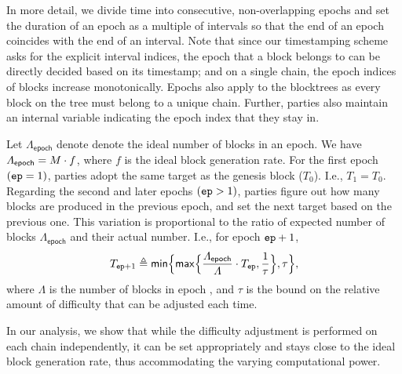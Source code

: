In more detail, we divide time into consecutive, non-overlapping epochs and set the duration \epochLen of an epoch as a multiple of intervals so that the end of an epoch coincides with the end of an interval.
%
Note that since our timestamping scheme asks for the explicit interval indices, the epoch that a block belongs to can be directly decided based on its timestamp; and on a single chain, the epoch indices of blocks increase monotonically.
%
Epochs also apply to the blocktrees as every block on the tree must belong to a unique chain.
%
Further, parties also maintain an internal variable \epoch indicating the epoch index that they stay in.

Let $\varLambda_{\mathsf{epoch}}$ denote denote the ideal number of blocks in an epoch.
%
We have $\varLambda_{\mathsf{epoch}} = M \cdot f$, where $f$ is the ideal block generation rate.
%
For the first epoch $(\mathtt{ep} = 1)$, parties adopt the same target as
the genesis block ($T_0$).
%
I.e., $T_1 = T_0$.
%
Regarding the second and later epochs $(\mathtt{ep} > 1)$, parties figure out how many blocks are produced in the previous epoch, and set the next target based on the previous one.
%
This variation is proportional to the ratio of expected number of blocks $\varLambda_{\mathsf{epoch}}$ and their actual number.
%
I.e., for epoch $\mathtt{ep} + 1$,
%
\begin{equation} \label{eq:target-recalc}
      T_{\mathtt{ep} + 1} \triangleq \mathsf{min} \Big\{ \mathsf{max} \Big\{ \frac{\varLambda_{\mathsf{epoch}}}{\varLambda} \cdot T_{\mathtt{ep}}, \frac{1}{\tau} \Big\}, \tau \Big\},
\end{equation}
%
where $\varLambda$ is the number of blocks in epoch \epoch, and $\tau$ is the bound on the relative amount of difficulty that can be adjusted each time.

In our analysis, we show that while the difficulty adjustment is performed on each chain independently, it can be set appropriately and stays close to the ideal block generation rate, thus accommodating the varying computational power.
